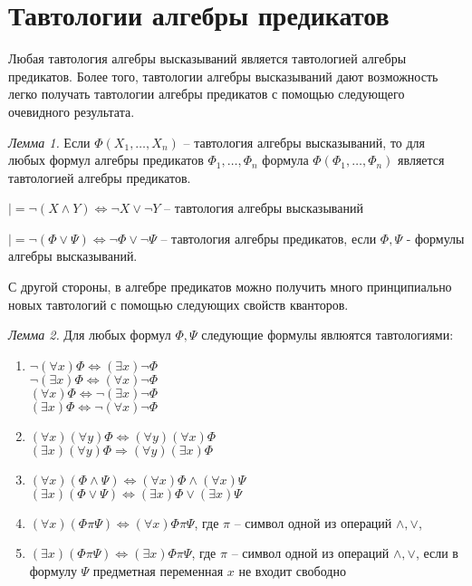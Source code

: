 \documentclass{SCWorks}
\begin{document}
\section{Тавтологии алгебры предикатов}
Любая тавтология алгебры высказываний является тавтологией алгебры предикатов. Более того, тавтологии алгебры высказываний дают возможность легко получать тавтологии алгебры предикатов с помощью следующего очевидного результата.
\par {\it Лемма 1.} Если $\Phi(X_1, \dots, X_n)$ -- тавтология алгебры высказываний, то для любых формул алгебры предикатов $\Phi_1, \dots, \Phi_n$ формула $\Phi(\Phi_1, \dots, \Phi_n)$ является тавтологией алгебры предикатов.
\par $|= \neg(X\land Y) \Leftrightarrow \neg X \lor \neg Y$ -- тавтология алгебры высказываний
\par $|= \neg(\Phi \lor \Psi) \Leftrightarrow \neg \Phi \lor \neg \Psi$ -- тавтология алгебры предикатов, если $\Phi, \Psi$ - формулы алгебры высказываний.
\par С другой стороны, в алгебре предикатов можно получить много принципиально новых тавтологий с помощью следующих свойств кванторов.
\par {\it Лемма 2.} Для любых формул $\Phi, \Psi$ следующие формулы явлюятся тавтологиями:
\begin{enumerate}
    \item $\neg(\forall x)\Phi \Leftrightarrow (\exists x)\neg\Phi$ \\ $\neg(\exists x)\Phi \Leftrightarrow (\forall x)\neg\Phi$ \\
    $(\forall x)\Phi \Leftrightarrow \neg(\exists x)\neg\Phi$ \\ $(\exists x)\Phi \Leftrightarrow \neg(\forall x)\neg\Phi$
    \item $(\forall x)(\forall y)\Phi \Leftrightarrow (\forall y)(\forall x)\Phi$ \\ $(\exists x)(\forall y)\Phi \Rightarrow (\forall y)(\exists x)\Phi$
    \item $(\forall x)(\Phi \land \Psi) \Leftrightarrow (\forall x)\Phi \land (\forall x)\Psi$ \\ $(\exists x)(\Phi \lor \Psi) \Leftrightarrow (\exists x)\Phi \lor (\exists x)\Psi$
    \item $(\forall x)(\Phi \pi \Psi) \Leftrightarrow (\forall x)\Phi \pi \Psi$, где $\pi$ -- символ одной из операций $\land, \lor$,
    \item $(\exists x)(\Phi \pi \Psi) \Leftrightarrow (\exists x)\Phi \pi \Psi$, где $\pi$ -- символ одной из операций $\land, \lor$, если в формулу $\Psi$ предметная переменная $x$ не входит свободно
\end{enumerate}
\end{document}
